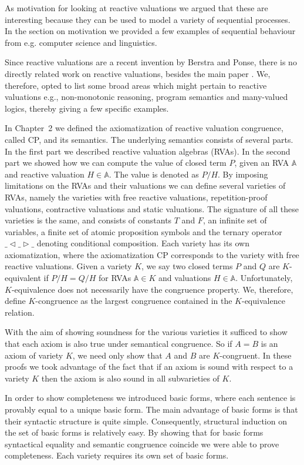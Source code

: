 \documentclass[a4paper,twoside,openright]{report}
\newcommand{\lef}{\ensuremath{\triangleleft}}
\newcommand{\rig}{\ensuremath{\triangleright}}
\begin{document}
As motivation for looking at reactive valuations we argued that these are interesting because they can be used to model a variety of sequential processes. In the section on motivation we provided a few examples of sequential behaviour from e.g. computer science and linguistics.

Since reactive valuations are a recent invention by Berstra and Ponse, there is no directly related work on reactive valuations, besides the main paper \cite{main}. We, therefore, opted to list some broad areas which might pertain to reactive valuations e.g., non-monotonic reasoning, program semantics and many-valued logics, thereby giving a few specific examples. 

In Chapter~2 we defined the axiomatization of reactive valuation congruence, called CP, and its semantics. The underlying semantics consists of several parts. In the first part we described reactive valuation algebras (RVAs). In the second part we showed how we can compute the value of closed term $P$, given an RVA $\mathbb{A}$ and reactive valuation $H\in\mathbb{A}$. The value is denoted as $P/H$. By imposing limitations on the RVAs and their valuations we can define several varieties of RVAs, namely the varieties with free reactive valuations, repetition-proof valuations, contractive valuations and static valuations. The signature of all these varieties is the same, and consists of constants $T$ and $F$, an infinite set of variables, a finite set of atomic proposition symbols and the ternary operator $\_\lef\_\rig\_$ denoting conditional composition. Each variety has its own axiomatization, where the axiomatization CP corresponds to the variety with free reactive valuations. Given a variety $K$, we say two closed terms $P$ and $Q$ are $K$-equivalent if $P/H=Q/H$ for RVAs $\mathbb{A}\in K$ and valuations $H\in\mathbb{A}$. Unfortunately, $K$-equivalence does not necessarily have the congruence property. We, therefore, define $K$-congruence as the largest congruence contained in the $K$-equivalence relation. 

With the aim of showing soundness for the various varieties it sufficed to show that each axiom is also true under semantical congruence. So if $A=B$ is an axiom of variety $K$, we need only show that $A$ and $B$ are $K$-congruent. In these proofs we took advantage of the fact that if an axiom is sound with respect to a variety $K$ then the axiom is also sound in all subvarieties of $K$.

In order to show completeness we introduced basic forms, where each sentence is provably equal to a unique basic form. The main advantage of basic forms is that their syntactic structure is quite simple. Consequently, structural induction on the set of basic forms is relatively easy. By showing that for basic forms syntactical equality and semantic congruence coincide we were able to prove completeness. Each variety requires its own set of basic forms.
\end{document}
